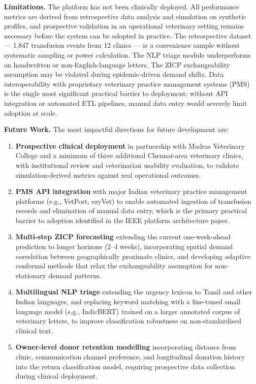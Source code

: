 \documentclass[12pt,a4paper]{article}
\begin{document}
\vspace{1.5em}
\noindent\textbf{Limitations.} The platform has not been clinically deployed. All performance metrics are derived from retrospective data analysis and simulation on synthetic profiles, and prospective validation in an operational veterinary setting remains necessary before the system can be adopted in practice. The retrospective dataset — 1,847 transfusion events from 12 clinics — is a convenience sample without systematic sampling or power calculation. The NLP triage module underperforms on handwritten or non-English-language letters. The ZICP exchangeability assumption may be violated during epidemic-driven demand shifts. Data interoperability with proprietary veterinary practice management systems (PMS) is the single most significant practical barrier to deployment: without API integration or automated ETL pipelines, manual data entry would severely limit adoption at scale.

\vspace{1.5em}
\noindent\textbf{Future Work.} The most impactful directions for future development are:

\begin{enumerate}[leftmargin=1.8em, itemsep=0.4em]
    \item \textbf{Prospective clinical deployment} in partnership with Madras Veterinary College and a minimum of three additional Chennai-area veterinary clinics, with institutional review and veterinarian usability evaluation, to validate simulation-derived metrics against real operational outcomes.
    \item \textbf{PMS API integration} with major Indian veterinary practice management platforms (e.g., VetPort, ezyVet) to enable automated ingestion of transfusion records and elimination of manual data entry, which is the primary practical barrier to adoption identified in the IEEE platform architecture paper.
    \item \textbf{Multi-step ZICP forecasting} extending the current one-week-ahead prediction to longer horizons (2--4 weeks), incorporating spatial demand correlation between geographically proximate clinics, and developing adaptive conformal methods that relax the exchangeability assumption for non-stationary demand patterns.
    \item \textbf{Multilingual NLP triage} extending the urgency lexicon to Tamil and other Indian languages, and replacing keyword matching with a fine-tuned small language model (e.g., IndicBERT) trained on a larger annotated corpus of veterinary letters, to improve classification robustness on non-standardised clinical text.
    \item \textbf{Owner-level donor retention modelling} incorporating distance from clinic, communication channel preference, and longitudinal donation history into the return classification model, requiring prospective data collection during clinical deployment.
\end{enumerate}
\end{document}

